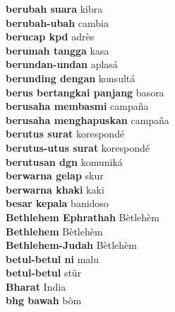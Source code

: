 \textbf{ berubah suara  } kibra \\
\textbf{ berubah-ubah  } cambia \\
\textbf{ berucap kpd  } adrès \\
\textbf{ berumah tangga  } kasa \\
\textbf{ berundan-undan  } aplasá \\
\textbf{ berunding dengan  } konsultá \\
\textbf{ berus bertangkai panjang  } basora \\
\textbf{ berusaha membasmi  } campaña \\
\textbf{ berusaha menghapuskan  } campaña \\
\textbf{ berutus surat  } korespondé \\
\textbf{ berutus-utus surat  } korespondé \\
\textbf{ berutusan dgn  } komuniká \\
\textbf{ berwarna gelap  } skur \\
\textbf{ berwarna khaki  } kaki \\
\textbf{ besar kepala  } banidoso \\
\textbf{ Bethlehem Ephrathah  } Bètlehèm \\
\textbf{ Bethlehem  } Bètlehèm \\
\textbf{ Bethlehem-Judah  } Bètlehèm \\
\textbf{ betul-betul ni  } malu \\
\textbf{ betul-betul  } stür \\
\textbf{ Bharat  } India \\
\textbf{ bhg bawah  } bòm \\
